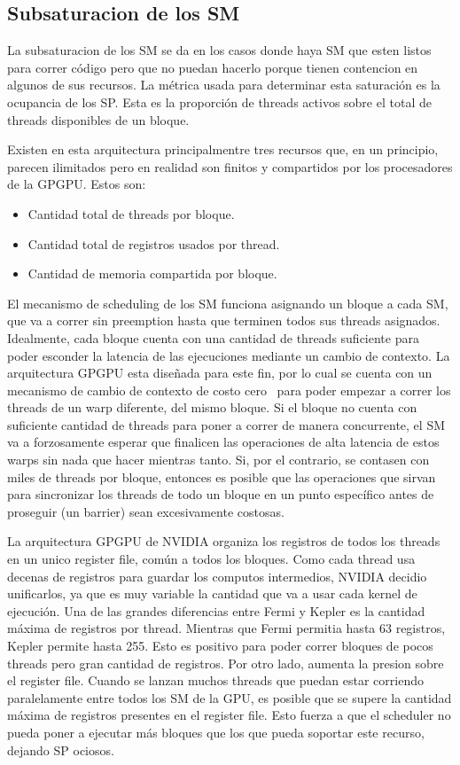 \subsection{Subsaturacion de los SM}
La subsaturacion de los SM se da en los casos donde haya SM que esten listos para correr
c\'odigo pero que no puedan hacerlo porque tienen contencion en algunos de sus recursos.
La m\'etrica usada para determinar esta saturaci\'on es la ocupancia de los SP.
Esta es la proporci\'on de threads activos sobre el total de threads disponibles de un bloque.

Existen en esta arquitectura principalmentre tres recursos que, en un principio, parecen
ilimitados pero en realidad son finitos y compartidos por los procesadores de la GPGPU.
Estos son:
\begin{itemize}
\item Cantidad total de threads por bloque.
\item Cantidad total de registros usados por thread.
\item Cantidad de memoria compartida por bloque.
\end{itemize}

El mecanismo de scheduling de los SM funciona asignando un bloque a cada SM, que
va a correr sin preemption hasta que terminen todos sus threads asignados. Idealmente, cada
bloque cuenta con una cantidad de threads suficiente para poder esconder la latencia
de las ejecuciones mediante un cambio de contexto. La arquitectura GPGPU esta dise\~nada
para este fin, por lo cual se cuenta con un mecanismo de cambio de contexto de costo cero~\cite{NvidiaFermi} para
poder empezar a correr los threads de un warp diferente, del mismo bloque.
Si el bloque no cuenta con suficiente cantidad de threads para poner a correr de manera
concurrente, el SM va a forzosamente esperar que finalicen las operaciones de alta latencia
de estos warps sin nada que hacer mientras tanto. Si, por el contrario, se contasen con
miles de threads por bloque, entonces es posible que las operaciones que sirvan
para sincronizar los threads de todo un bloque en un punto espec\'ifico antes de proseguir
(un barrier) sean excesivamente costosas.

La arquitectura GPGPU de NVIDIA organiza los registros de todos los threads en un unico
register file, com\'un a todos los bloques. Como cada thread usa decenas de registros para guardar
los computos intermedios, NVIDIA decidio unificarlos, ya que es muy variable la cantidad que va a usar
cada kernel de ejecuci\'on. Una de las grandes diferencias entre Fermi y Kepler es la cantidad m\'axima de
registros por thread. Mientras que Fermi permitia hasta 63 registros, Kepler permite hasta 255. Esto
es positivo para poder correr bloques de pocos threads pero gran cantidad de registros. Por otro lado,
aumenta la presion sobre el register file. Cuando se lanzan muchos threads
que puedan estar corriendo paralelamente entre todos los SM de la GPU, es posible que se supere
la cantidad m\'axima de registros presentes en el register file. Esto fuerza a que el scheduler
no pueda poner a ejecutar m\'as bloques que los que pueda soportar este recurso, dejando SP ociosos.

